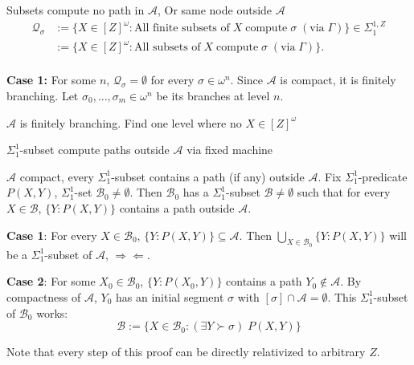 \begin{frame}{Subsets compute no path in $\mathcal{A}$, Or same node
outside $\mathcal{A}$}
  \begin{align*}
    \mathcal{Q}_{\sigma} &:=\{X\in[Z]^\omega: \text{All finite subsets
      of}\; X\; \text{compute}\; \sigma\; (\text{via}\; \Gamma)\}
      \in\Sigma_1^{1,Z}\\
    &:=\{X\in[Z]^\omega: \text{All subsets of}\; X\; \text{compute}\;
      \sigma\; (\text{via}\; \Gamma)\}.\\
  \end{align*}

  \textbf{Case 1:} For some $n$, $\mathcal{Q}_\sigma=\emptyset$ for every
  $\sigma\in\omega^n$. Since $\mathcal{A}$ is compact, it is finitely
  branching. Let $\sigma_0,\ldots,\sigma_m\in\omega^n$ be its branches at
  level $n$.

  $\mathcal{A}$ is finitely branching. Find one level where no
  $X\in[Z]^\omega$
\end{frame}

\begin{frame}{$\Sigma_1^1$-subset compute paths outside
$\mathcal{A}$ via fixed machine}
  \begin{claim}
    $\mathcal{A}$ compact, every $\Sigma_1^{1}$-subset contains a path (if
    any) outside $\mathcal{A}$. Fix $\Sigma_1^{1}$-predicate $P(X,Y)$,
    $\Sigma_1^{1}$-set $\mathcal{B}_0\neq\emptyset$. Then $\mathcal{B}_0$
    has a $\Sigma_1^{1}$-subset $\mathcal{B}\neq\emptyset$ such that for
    every $X\in\mathcal{B}$, $\{Y:P(X,Y)\}$ contains a path outside
    $\mathcal{A}$.
  \end{claim}

  \textbf{Case 1}: For every $X\in\mathcal{B}_0$,
  $\{Y:P(X,Y)\}\subseteq\mathcal{A}$. Then $\bigcup_{X\in\mathcal{B}_0}
  \{Y:P(X,Y)\}$ will be a $\Sigma_1^1$-subset of $\mathcal{A}$,
  $\Rightarrow\Leftarrow$.

  \vspace{0.5em}
  \textbf{Case 2}: For some $X_0\in\mathcal{B}_0$, $\{Y:P(X_0,Y)\}$
  contains a path $Y_0\not\in\mathcal{A}$. By compactness of $\mathcal{A}$,
  $Y_0$ has an initial segment $\sigma$ with $[\sigma]\cap\mathcal{A}
  =\emptyset$. This $\Sigma_1^1$-subset of $\mathcal{B}_0$ works:
  \[\mathcal{B}:= \{X\in\mathcal{B}_0: (\exists Y\succ\sigma)\; P(X,Y)\}\]

  Note that every step of this proof can be directly relativized to
  arbitrary $Z$.
\end{frame}

